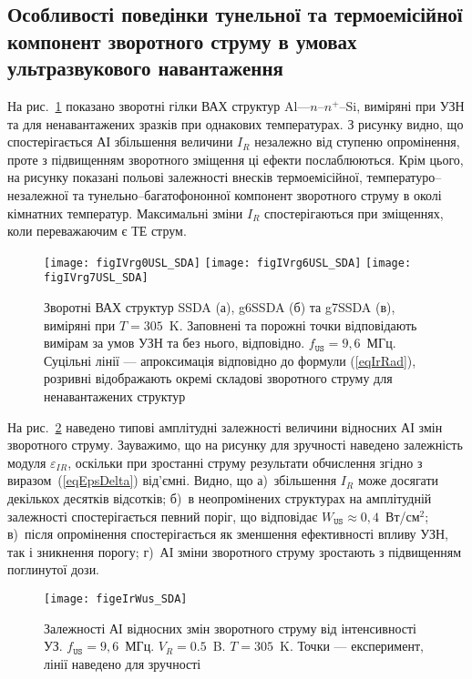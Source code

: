 \subsection{Особливості поведінки тунельної та термоемісійної компонент зворотного струму в умовах ультразвукового навантаження}

На рис.~\ref{figIVrg0USL_SDA} показано зворотні гілки ВАХ структур Al---$n$--$n^+$--Si, виміряні при УЗН та для ненавантажених
зразків при однакових температурах.
З рисунку видно, що спостерігається АІ збільшення величини $I_R$ незалежно від ступеню опромінення, проте з підвищенням зворотного
зміщення ці ефекти послаблюються.
Крім цього, на рисунку показані польові залежності внесків термоемісійної, температуро--незалежної та тунельно--багатофононної компонент
зворотного струму в околі кімнатних температур.
Максимальні зміни $I_R$ спостерігаються при зміщеннях, коли переважаючим є ТЕ струм.


\begin{figure}
\center
\texttt{[image: figIVrg0USL\_SDA]}
\texttt{[image: figIVrg6USL\_SDA]}
\texttt{[image: figIVrg7USL\_SDA]}
\caption{\label{figIVrg0USL_SDA}
Зворотні  ВАХ  структур SSDA (а), g6SSDA (б) та g7SSDA (в), виміряні при $T=305$~K.
Заповнені та порожні точки відповідають вимірам за умов УЗН та без нього, відповідно.
$f_\mathtt{US}=9,6$~МГц.
Суцільні лінії --- апроксимація відповідно до формули (\ref{eqIrRad}),
розривні відображають окремі складові зворотного струму для ненавантажених структур
}%
\end{figure}



На рис.~\ref{figeIrWus_SDA} наведено типові амплітудні залежності величини відносних АІ змін зворотного струму.
Зауважимо, що на рисунку для зручності наведено залежність модуля $\varepsilon_{IR}$, оскільки при зростанні струму результати обчислення згідно з виразом~(\ref{eqEpsDelta}) від'ємні.
Видно, що
а)~збільшення $I_R$ може досягати декількох десятків відсотків;
б)~в неопромінених структурах на амплітудній залежності спостерігається певний поріг, що відповідає $W_\mathtt{US}\approx0,4$~Вт/см$^2$;
в)~після опромінення спостерігається як зменшення ефективності впливу УЗН, так і зникнення порогу;
г)~АІ зміни зворотного струму зростають з підвищенням поглинутої дози.


\begin{figure}
\center
\texttt{[image: figeIrWus\_SDA]}
\caption{\label{figeIrWus_SDA}
Залежності АІ відносних змін зворотного струму від інтенсивності УЗ.
$f_\mathtt{US}=9,6$~МГц.
$V_R=0.5$~B. $T=305$~K.
Точки --- експеримент,
лінії наведено для зручності
}%
\end{figure}

